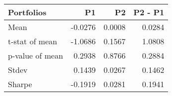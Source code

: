 \begin{tabular}{lrrr}
\toprule
Portfolios & P1 & P2 & P2 - P1 \\
\midrule
Mean & -0.0276 & 0.0008 & 0.0284 \\
t-stat of mean & -1.0686 & 0.1567 & 1.0808 \\
p-value of mean & 0.2938 & 0.8766 & 0.2884 \\
Stdev & 0.1439 & 0.0267 & 0.1462 \\
Sharpe & -0.1919 & 0.0281 & 0.1941 \\
\bottomrule
\end{tabular}
